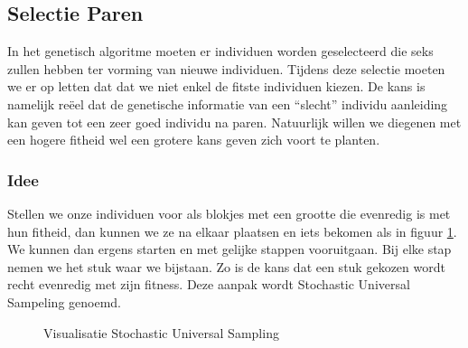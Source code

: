 %
\subsection{Selectie Paren}
\label{sub:SUS}
In het genetisch algoritme moeten er individuen worden geselecteerd die seks zullen hebben ter vorming van nieuwe individuen.
Tijdens deze selectie moeten we er op letten dat dat we niet enkel de fitste individuen kiezen. De kans is namelijk reëel dat de genetische informatie van een ``slecht'' individu aanleiding kan geven tot een zeer goed individu na paren. Natuurlijk willen we diegenen met een hogere fitheid wel een grotere kans geven zich voort te planten.

\subsubsection{Idee}
Stellen we onze individuen voor als blokjes met een grootte die evenredig is met hun fitheid, dan kunnen we ze na elkaar plaatsen en iets bekomen als in figuur \ref{fig:SUS}. 
We kunnen dan ergens starten en met gelijke stappen vooruitgaan. Bij elke stap nemen we het stuk waar we bijstaan. Zo is de kans dat een stuk gekozen wordt recht evenredig met zijn fitness. Deze aanpak wordt Stochastic Universal Sampeling genoemd.

\begin{center}
\begin{figure}[H]
\centering
{}
\caption{Visualisatie Stochastic Universal Sampling}
\label{fig:SUS}
\end{figure}
\end{center}


